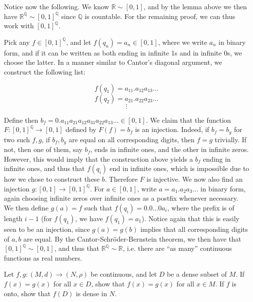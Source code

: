 \begin{solution}
    Notice now the following.
    We know $\mathbb{R} \sim [0, 1]$, and by the lemma above we then have $\mathbb{R}^\mathbb{Q} \sim [0, 1]^\mathbb{Q}$ since $\mathbb{Q}$ is countable.
    For the remaining proof, we can thus work with $[0, 1]^\mathbb{Q}$.
    
    Pick any $f \in [0, 1]^{\mathbb{Q}}$, and let $f(q_n) = a_n \in [0, 1]$, where we write $a_n$ in binary form, and if it can be written as both ending in infinite 1s and in infinite 0s, we choose the latter.
    In a manner similar to Cantor's diagonal argument, we construct the following list:

    \[f(q_1) = a_{11}.a_{12}a_{13}\ldots\]
    \[f(q_2) = a_{21}.a_{22}a_{23} \ldots\]
    \[\vdots\]

    Define then $b_f = 0.a_{11}a_{21}a_{12}a_{31}a_{22}a_{13}\ldots \in [0, 1]$.
    We claim that the function $F: [0, 1]^{\mathbb{Q}} \rightarrow [0, 1]$ defined by $F(f) = b_f$ is an injection.
    Indeed, if $b_f = b_g$ for two such $f, g$, if $b_f, b_g$ are equal on all corresponding digits, then $f = g$ trivially.
    If not, then one of them, say $b_f$, ends in infinite ones, and the other in infinite zeros.
    However, this would imply that the construction above yields a $b_f$ ending in infinite ones, and thus that $f(q_i)$ end in infinite ones, which is impossible due to how we chose to construct these $b$.
    Therefore $F$ is injective.
    We now also find an injection $g: [0, 1] \rightarrow [0, 1]^{\mathbb{Q}}$.
    For $a \in [0, 1]$, write $a = a_1.a_2 a_3 \ldots$ in binary form, again choosing infinite zeros over infinite ones as a postfix whenever necessary.
    We then define $g(a) = f$ such that $f(q_i) = 0.0\ldots 0 a_i$, where the prefix is of length $i - 1$ (for $f(q_1)$, we have $f(q_1) = a_1$).
    Notice again that this is easily seen to be an injection, since $g(a) = g(b)$ implies that all corresponding digits of $a, b$ are equal.
    By the Cantor-Schröder-Bernstein theorem, we then have that $[0, 1]^{\mathbb{Q}} \sim [0, 1]$, and thus that $\mathbb{R}^\mathbb{Q} \sim \mathbb{R}$, i.e. there are ``as many'' continuous functions as real numbers.

\end{solution}

\begin{exercise}{17}
    Let $f, g: (M, d) \rightarrow (N, \rho)$ be continuous, and let $D$ be a dense subset of $M$.
    If $f(x) = g(x)$ for all $x \in D$, show that $f(x) = g(x)$ for all $x \in M$.
    If $f$ is onto, show that $f(D)$ is dense in $N$.
\end{exercise}

